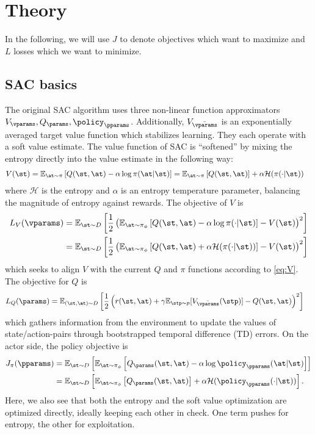 \section{Theory}
In the following, we will use \(J\) to denote objectives which want to maximize and \(L\) losses which we want to minimize.
\subsection{SAC basics}
The original SAC algorithm uses three non-linear function approximators \(V_\vparams, Q_\params, \policy_\pparams\). Additionally, \(V_{\bar{\vparams}}\) is an exponentially averaged target value function which stabilizes learning. They each operate with a soft value estimate. The value function of SAC is ``softened'' by mixing the entropy directly into the value estimate in the following way:
\begin{align}
    V(\st) &= \mathbb{E}_{\at \sim \pi} \left[Q(\st,\at) - \alpha \log {\pi(\at|\st)}\right]
    = \mathbb{E}_{\at \sim \pi} \left[Q(\st,\at)\right] + \alpha \mathcal{H}( {\pi(\cdot|\st))} \label{eq:V}
\end{align}
where \(\mathcal{H}\) is the entropy and \(\alpha\) is an entropy temperature parameter, balancing the magnitude of entropy against rewards. The objective of \(V\) is 
\begin{align}    
    L_{V}(\vparams) &= \mathbb{E}_{\st \sim D} \left[ \frac{1}{2} \left( \mathbb{E}_{\at \sim \pi_\phi} \left[ Q(\st, \at) - \alpha \log \pi(\cdot| \st) \right]  - V(\st) \right)^2 \right] \notag \\
    &= \mathbb{E}_{\st \sim D} \left[ \frac{1}{2} \left( \mathbb{E}_{\at \sim \pi_\phi} \left[ Q(\st, \at) + \alpha \mathcal{H}(\pi(\cdot|\st)) \right]  - V(\st) \right)^2 \right]
\end{align}
which seeks to align \(V\) with the current \(Q\) and \(\pi\) functions according to \eqref{eq:V}. The objective for \(Q\) is
\begin{align}
    L_Q(\params) &= \mathbb{E}_{(\st,\at) \sim D} \left[ \frac{1}{2} \left( r(\st, \at) + \gamma \mathbb{E}_{\stp \sim p}[V_{\bar{\vparams}}(\stp)] - Q(\st,\at)  \right)^2 \right]
\end{align}
which gathers information from the environment to update the values of state/action-pairs through bootstrapped temporal difference (TD) errors. On the actor side, the policy objective is
\begin{align}
    J_\pi(\pparams) &= \mathbb{E}_{\st \sim D} \left[ \mathbb{E}_{\at \sim \pi_\phi} \left[ Q_\params(\st, \at) - {\alpha \log \policy_\pparams(\at | \st) }  \right] \right] \notag\\
    &= \mathbb{E}_{\st \sim D} \left[
        \mathbb{E}_{\at \sim \pi_\phi} \left[ Q_\params(\st, \at) \right]
        + \alpha \mathcal{H}(\policy_\pparams(\cdot | \st))
    \right]. \label{eq:J_pi_SAC}
\end{align}
Here, we also see that both the entropy and the soft value optimization are optimized directly, ideally keeping each other in check. One term pushes for entropy, the other for exploitation.

